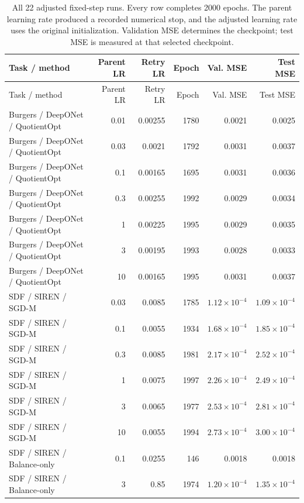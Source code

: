 \begingroup\small\setlength{\tabcolsep}{4pt}
\begin{longtable}{@{}lrrrrr@{}}
\caption{All 22 adjusted fixed-step runs. Every row completes 2000 epochs. The parent learning rate produced a recorded numerical stop, and the adjusted learning rate uses the original initialization. Validation MSE determines the checkpoint; test MSE is measured at that selected checkpoint.}\label{tab:retry-all}\\
\toprule Task / method & Parent LR & Retry LR & Epoch & Val. MSE & Test MSE\\\midrule\endfirsthead
\toprule Task / method & Parent LR & Retry LR & Epoch & Val. MSE & Test MSE\\\midrule\endhead
\rowcolor{oursbg}Burgers / DeepONet / QuotientOpt & 0.01 & 0.00255 & 1780 & 0.0021 & 0.0025\\
\rowcolor{oursbg}Burgers / DeepONet / QuotientOpt & 0.03 & 0.0021 & 1792 & 0.0031 & 0.0037\\
\rowcolor{oursbg}Burgers / DeepONet / QuotientOpt & 0.1 & 0.00165 & 1695 & 0.0031 & 0.0036\\
\rowcolor{oursbg}Burgers / DeepONet / QuotientOpt & 0.3 & 0.00255 & 1992 & 0.0029 & 0.0034\\
\rowcolor{oursbg}Burgers / DeepONet / QuotientOpt & 1 & 0.00225 & 1995 & 0.0029 & 0.0035\\
\rowcolor{oursbg}Burgers / DeepONet / QuotientOpt & 3 & 0.00195 & 1993 & 0.0028 & 0.0033\\
\rowcolor{oursbg}Burgers / DeepONet / QuotientOpt & 10 & 0.00165 & 1995 & 0.0031 & 0.0037\\
SDF / SIREN / SGD-M & 0.03 & 0.0085 & 1785 & $1.12\!\times\!10^{-4}$ & $1.09\!\times\!10^{-4}$\\
SDF / SIREN / SGD-M & 0.1 & 0.0055 & 1934 & $1.68\!\times\!10^{-4}$ & $1.85\!\times\!10^{-4}$\\
SDF / SIREN / SGD-M & 0.3 & 0.0085 & 1981 & $2.17\!\times\!10^{-4}$ & $2.52\!\times\!10^{-4}$\\
SDF / SIREN / SGD-M & 1 & 0.0075 & 1997 & $2.26\!\times\!10^{-4}$ & $2.49\!\times\!10^{-4}$\\
SDF / SIREN / SGD-M & 3 & 0.0065 & 1977 & $2.53\!\times\!10^{-4}$ & $2.81\!\times\!10^{-4}$\\
SDF / SIREN / SGD-M & 10 & 0.0055 & 1994 & $2.73\!\times\!10^{-4}$ & $3.00\!\times\!10^{-4}$\\
SDF / SIREN / Balance-only & 0.1 & 0.0255 & 146 & 0.0018 & 0.0018\\
SDF / SIREN / Balance-only & 3 & 0.85 & 1974 & $1.20\!\times\!10^{-4}$ & $1.35\!\times\!10^{-4}$\\

\end{longtable}
